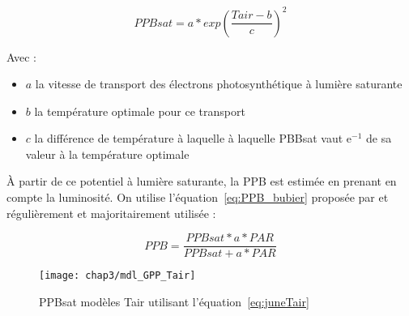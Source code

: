 \begin{equation}\label{eq:juneTair}
PPBsat = a * exp(\frac{Tair - b}{c})^2
\end{equation}

Avec :
\begin{itemize}
\item $a$ la vitesse de transport des électrons photosynthétique à lumière saturante
\item $b$ la température optimale pour ce transport
\item $c$ la différence de température à laquelle à laquelle PBBsat vaut e$^{-1}$ de sa valeur à la température optimale
\end{itemize}

À partir de ce potentiel à lumière saturante, la PPB est estimée en prenant en compte la luminosité.
On utilise l'équation~\ref{eq:PPB_bubier} proposée par \citep{bubier1998} et régulièrement et majoritairement utilisée \citep{bortoluzzi2006a,worrall2009}:

\begin{equation} \label{eq:PPB_bubier}
PPB = \frac{PPBsat * a * PAR}{PPBsat + a * PAR}
\end{equation}

\begin{figure}
\centering
\texttt{[image: chap3/mdl\_GPP\_Tair]}
\caption{PPBsat modèles Tair utilisant l'équation~\ref{eq:juneTair}}
\label{fig:mdl_GPP_Tair}
\end{figure}

